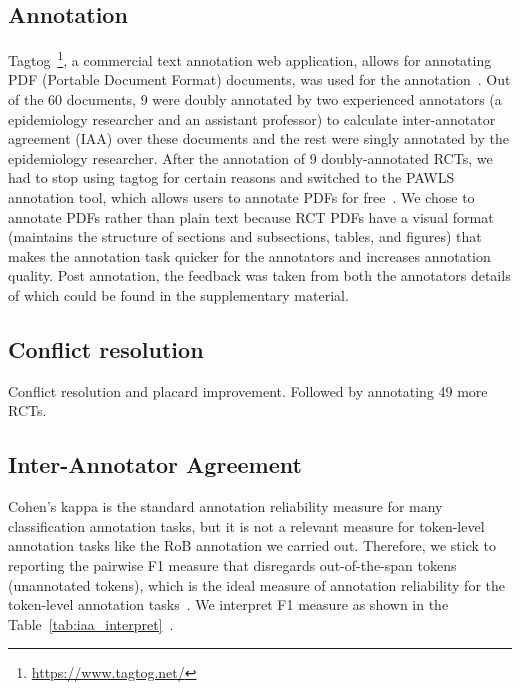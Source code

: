 \documentclass[sn-mathphys,Numbered]{sn-jnl}%
\theoremstyle{thmstyleone}%
\theoremstyle{thmstyletwo}%
\theoremstyle{thmstylethree}%
\begin{document}
%
%
%
%
%
%
\subsection{Annotation}
\label{annotation}
%
Tagtog~\footnote{\url{https://www.tagtog.net/}}, a commercial text annotation web application, allows for annotating PDF (Portable Document Format) documents, was used for the annotation~\cite{cejuela2014tagtog}.
Out of the 60 documents, 9 were doubly annotated by two experienced annotators (a epidemiology researcher and an assistant professor) to calculate inter-annotator agreement (IAA) over these documents and the rest were singly annotated by the epidemiology researcher.
After the annotation of 9 doubly-annotated RCTs, we had to stop using tagtog for certain reasons and switched to the PAWLS annotation tool, which allows users to annotate PDFs for free~\cite{neumann2021pawls}.
We chose to annotate PDFs rather than plain text because RCT PDFs have a visual format (maintains the structure of sections and subsections, tables, and figures) that makes the annotation task quicker for the annotators and increases annotation quality.
Post annotation, the feedback was taken from both the annotators details of which could be found in the supplementary material. %
%
%
%
\subsection{Conflict resolution}
\label{conflicts}
%
Conflict resolution and placard improvement.
Followed by annotating 49 more RCTs.
%
%
%
\subsection{Inter-Annotator Agreement}
\label{subsec:corpus}
%
Cohen's kappa is the standard annotation reliability measure for many classification annotation tasks, but it is not a relevant measure for token-level annotation tasks like the RoB annotation we carried out.
Therefore, we stick to reporting the pairwise F1 measure that disregards out-of-the-span tokens (unannotated tokens), which is the ideal measure of annotation reliability for the token-level annotation tasks~\cite{brandsen2020creating,deleger2012building}.
We interpret F1 measure as shown in the Table~\ref{tab:iaa_interpret}~\cite{landis1977measurement}.
\end{document}
